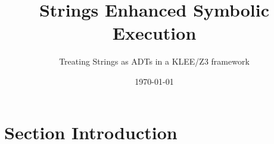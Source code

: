 \documentclass{beamer}
\begin{document}
\title{Strings Enhanced Symbolic Execution}   

\author{Treating Strings as ADTs in a KLEE/Z3 framework}

\date{\today} 

\frame{\titlepage} 


\section{Section Introduction} 
\end{document}
